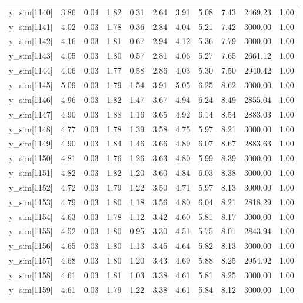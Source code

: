 \begin{table}[ht]
\begin{tabular}{rrrrrrrrrrr}
  y\_sim[1140] & 3.86 & 0.04 & 1.82 & 0.31 & 2.64 & 3.91 & 5.08 & 7.43 & 2469.23 & 1.00 \\ 
  y\_sim[1141] & 4.02 & 0.03 & 1.78 & 0.36 & 2.84 & 4.04 & 5.21 & 7.42 & 3000.00 & 1.00 \\ 
  y\_sim[1142] & 4.16 & 0.03 & 1.81 & 0.67 & 2.94 & 4.12 & 5.36 & 7.79 & 3000.00 & 1.00 \\ 
  y\_sim[1143] & 4.05 & 0.03 & 1.80 & 0.57 & 2.81 & 4.06 & 5.27 & 7.65 & 2661.12 & 1.00 \\ 
  y\_sim[1144] & 4.06 & 0.03 & 1.77 & 0.58 & 2.86 & 4.03 & 5.30 & 7.50 & 2940.42 & 1.00 \\ 
  y\_sim[1145] & 5.09 & 0.03 & 1.79 & 1.54 & 3.91 & 5.05 & 6.25 & 8.62 & 3000.00 & 1.00 \\ 
  y\_sim[1146] & 4.96 & 0.03 & 1.82 & 1.47 & 3.67 & 4.94 & 6.24 & 8.49 & 2855.04 & 1.00 \\ 
  y\_sim[1147] & 4.90 & 0.03 & 1.88 & 1.16 & 3.65 & 4.92 & 6.14 & 8.54 & 2883.03 & 1.00 \\ 
  y\_sim[1148] & 4.77 & 0.03 & 1.78 & 1.39 & 3.58 & 4.75 & 5.97 & 8.21 & 3000.00 & 1.00 \\ 
  y\_sim[1149] & 4.90 & 0.03 & 1.84 & 1.46 & 3.66 & 4.89 & 6.07 & 8.67 & 2883.63 & 1.00 \\ 
  y\_sim[1150] & 4.81 & 0.03 & 1.76 & 1.26 & 3.63 & 4.80 & 5.99 & 8.39 & 3000.00 & 1.00 \\ 
  y\_sim[1151] & 4.82 & 0.03 & 1.82 & 1.20 & 3.60 & 4.84 & 6.03 & 8.38 & 3000.00 & 1.00 \\ 
  y\_sim[1152] & 4.72 & 0.03 & 1.79 & 1.22 & 3.50 & 4.71 & 5.97 & 8.13 & 3000.00 & 1.00 \\ 
  y\_sim[1153] & 4.79 & 0.03 & 1.80 & 1.18 & 3.56 & 4.80 & 6.04 & 8.21 & 2818.29 & 1.00 \\ 
  y\_sim[1154] & 4.63 & 0.03 & 1.78 & 1.12 & 3.42 & 4.60 & 5.81 & 8.17 & 3000.00 & 1.00 \\ 
  y\_sim[1155] & 4.52 & 0.03 & 1.80 & 0.95 & 3.30 & 4.51 & 5.75 & 8.01 & 2843.94 & 1.00 \\ 
  y\_sim[1156] & 4.65 & 0.03 & 1.80 & 1.13 & 3.45 & 4.64 & 5.82 & 8.13 & 3000.00 & 1.00 \\ 
  y\_sim[1157] & 4.68 & 0.03 & 1.80 & 1.20 & 3.43 & 4.69 & 5.88 & 8.25 & 2954.92 & 1.00 \\ 
  y\_sim[1158] & 4.61 & 0.03 & 1.81 & 1.03 & 3.38 & 4.61 & 5.81 & 8.25 & 3000.00 & 1.00 \\ 
  y\_sim[1159] & 4.61 & 0.03 & 1.79 & 1.22 & 3.38 & 4.61 & 5.84 & 8.12 & 3000.00 & 1.00 \\ 

\end{tabular}
\end{table}
